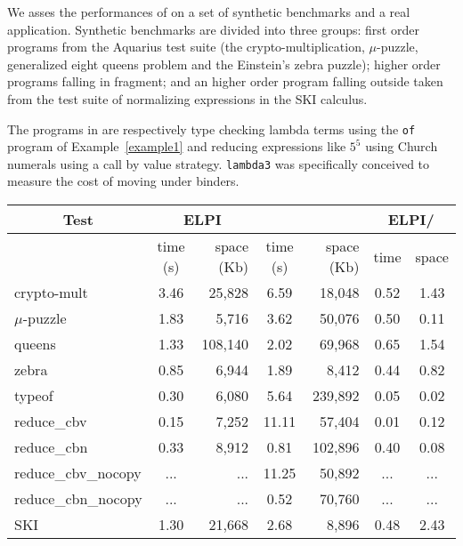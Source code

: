 \documentclass{llncs}
\begin{document}
We asses the performances of \elpi{} on a set of synthetic benchmarks and
a real application.  Synthetic benchmarks are divided into three groups:
first order programs from the Aquarius test suite (the
crypto-multiplication, $\mu$-puzzle,
generalized eight queens problem and the Einstein's zebra puzzle);
higher order programs falling in \rff{} fragment; and an higher
order program falling outside \rff{} taken from the test suite of
\tedius{} normalizing expressions in the SKI calculus.

The programs in \rff{} are respectively type checking lambda terms using
the \verb+of+ program of Example~\ref{example1} and reducing expressions like
$5^5$ using Church numerals using a call by value strategy. \verb+lambda3+ was
specifically conceived to measure the cost of moving under binders.

\begin{center}
  \scriptsize 
  \begin{tabular}{|p{1.5cm}||c|r||c|r||c|c|}
    \hline
      \multicolumn{1}{|c||}{Test} &
      \multicolumn{2}{|c||}{ELPI} &
      \multicolumn{2}{|c||}{\tedius{}} &
      \multicolumn{2}{|c|}{ELPI/\tedius{}} \\
    \hline
    &  time (s)     & space (Kb)  & time (s) & space (Kb) &  time & space \\
    
    \hline
    \hline
    crypto-mult &  3.46 & 25,828  & 6.59 & 18,048 &  0.52 & 1.43 \\
    \hline    
    $\mu$-puzzle &  1.83 & 5,716 &  3.62 & 50,076 &  0.50 & 0.11 \\
    \hline
    queens &  1.33  & 108,140 &  2.02 & 69,968 &  0.65 & 1.54 \\
    \hline    
    zebra &  0.85 & 6,944 &  1.89 & 8,412 &  0.44 & 0.82 \\
    \hline     
    \hline
    typeof &  0.30 & 6,080 &  5.64 & 239,892 &  0.05 & 0.02 \\
    \hline
    reduce\_cbv &  0.15 & 7,252 &  11.11 & 57,404  & 0.01 & 0.12 \\
    \hline
    reduce\_cbn &  0.33 & 8,912 &  0.81 & 102,896  & 0.40 & 0.08 \\
    \hline
    reduce\_cbv\_nocopy & ... & ... &  11.25 & 50,892  & ... & ... \\
    \hline
    reduce\_cbn\_nocopy & ... & ... &  0.52 & 70,760  & ... & ... \\
    \hline
    \hline
    SKI &  1.30 & 21,668 &  2.68 & 8,896  & 0.48 & 2.43 \\
    \hline
    
  \end{tabular}
\end{center}
\end{document}

